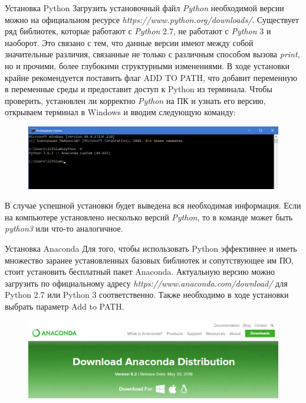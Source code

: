 \documentclass[8pt,pdf,hyperref={unicode}, xcolor=dvipsnames, fleqn]{beamer}
\begin{document}
\begin{frame}{Установка Python}
Загрузить установочный файл \textit{Python} необходимой версии можно на официальном ресурсе \textit{https://www.python.org/downloads/}. Существует ряд библиотек, которые работают с \textit{Python} 2.7, не работают с \textit{Python} 3 и наоборот. Это связано с тем, что данные версии имеют между собой значительные различия, связанные не только с различным способом вызова \textit{print}, но и прочими, более глубокими структурными изменениями. В ходе установки крайне рекомендуется поставить флаг ADD TO PATH, что добавит переменную в переменные среды и предоставит доступ к Python из терминала. Чтобы проверить, установлен ли корректно \textit{Python} на ПК и узнать его версию, открываем терминал в Windows и вводим следующую команду:
\begin{figure}
	\includegraphics[width=1.0\textwidth]{Images/cmd.png}
\end{figure}
В случае успешной установки будет выведена вся необходимая информация. Если на компьютере установлено несколько версий \textit{Python}, то в команде может быть \textit{python3} или что-то аналогичное.


\end{frame}
\begin{frame}{Установка Anaconda}
Для того, чтобы использовать Python эффективнее и иметь множество заранее установленных базовых библиотек и сопутствующее им ПО, стоит установить бесплатный пакет Anaconda. Актуальную версию можно загрузить по официальному адресу \textit{https://www.anaconda.com/download/} для Python 2.7 или Python 3 соответственно. Также необходимо в ходе установки выбрать параметр Add to PATH.
\begin{figure}
	\includegraphics[width=1.0\textwidth]{Images/anac.png}
\end{figure}


\end{frame}
\end{document}
